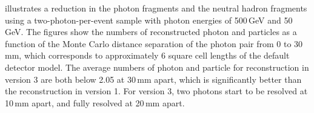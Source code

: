  illustrates a reduction in the photon fragments and the neutral hadron fragments using a two-photon-per-event sample with photon energies of  500\,GeV and 50\,GeV. The figures show the numbers of reconstructed photon and particles as a function of  the Monte Carlo distance separation of the photon pair from 0 to 30\,mm, which corresponds to approximately 6 \ECAL square cell lengths of the default \ILD detector model.  The average numbers of photon and particle for reconstruction in \pandora version 3 are both below 2.05 at 30\,mm apart, which is significantly better than the reconstruction in \pandora version 1. For \pandora version 3, two photons start to be resolved at 10\,mm apart, and fully resolved at 20\,mm apart.


